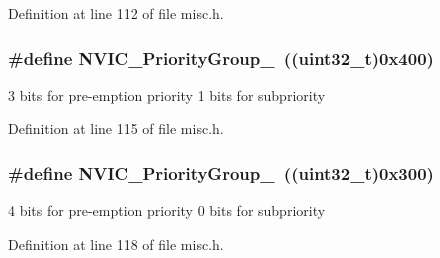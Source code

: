 Definition at line 112 of file misc.\-h.

\hypertarget{group___m_i_s_c___preemption___priority___group_ga49bdbee77d4a70339d63c80462d49b4d}{
\subsubsection[{N\-V\-I\-C\-\_\-\-Priority\-Group\-\_\-3}]{\setlength{\rightskip}{0pt plus 5cm}\#define N\-V\-I\-C\-\_\-\-Priority\-Group\-\_~((uint32\-\_\-t)0x400)}}\label{group___m_i_s_c___preemption___priority___group_ga49bdbee77d4a70339d63c80462d49b4d}
3 bits for pre-\/emption priority 1 bits for subpriority 

Definition at line 115 of file misc.\-h.

\hypertarget{group___m_i_s_c___preemption___priority___group_gaf9020c585da2a299328f0b06dee391a2}{
\subsubsection[{N\-V\-I\-C\-\_\-\-Priority\-Group\-\_\-4}]{\setlength{\rightskip}{0pt plus 5cm}\#define N\-V\-I\-C\-\_\-\-Priority\-Group\-\_~((uint32\-\_\-t)0x300)}}\label{group___m_i_s_c___preemption___priority___group_gaf9020c585da2a299328f0b06dee391a2}
4 bits for pre-\/emption priority 0 bits for subpriority 

Definition at line 118 of file misc.\-h.

